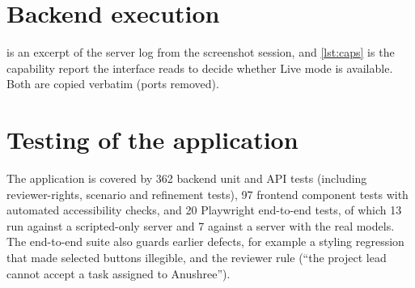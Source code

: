 \section{Backend execution}
 is an excerpt of the server log from the screenshot session, and \cref{lst:caps} is the capability report the interface reads to decide whether Live mode is available. Both are copied verbatim (ports removed).





\section{Testing of the application}
The application is covered by 362 backend unit and API tests (including reviewer-rights, scenario and refinement tests), 97 frontend component tests with automated accessibility checks, and 20 Playwright end-to-end tests, of which 13 run against a scripted-only server and 7 against a server with the real models. The end-to-end suite also guards earlier defects, for example a styling regression that made selected buttons illegible, and the reviewer rule (``the project lead cannot accept a task assigned to Anushree'').
